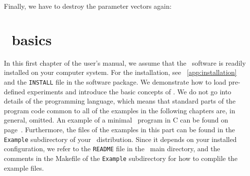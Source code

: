Finally, we have to destroy the parameter vectors again:

\chapter{\GLOBES\ basics}
\label{chapt:gettingstarted}

In this first chapter of the user's manual, we assume that the \GLOBES\ software is readily installed on your computer system. For the installation,
see \App~\ref{app:installation} and the {\tt INSTALL} file in the
software package. We demonstrate how to load pre-defined experiments 
and introduce the basic concepts of \GLOBES . We do not go
into details of the programming language, which means that standard parts
of the program code common to all of the examples in the following chapters are, in general, omitted.
An example of a minimal \GLOBES\ program in C can be found on page~\pageref{ex:c}. Furthermore, the files of the examples in this part can be found in the {\tt Example} subdirectory of your \GLOBES\ distribution.  Since it depends on your installed
configuration, we refer to the {\tt README} file in the \GLOBES\ main directory, and the comments in the Makefile of the {\tt Example} subdirectory for how to complile the example files.

